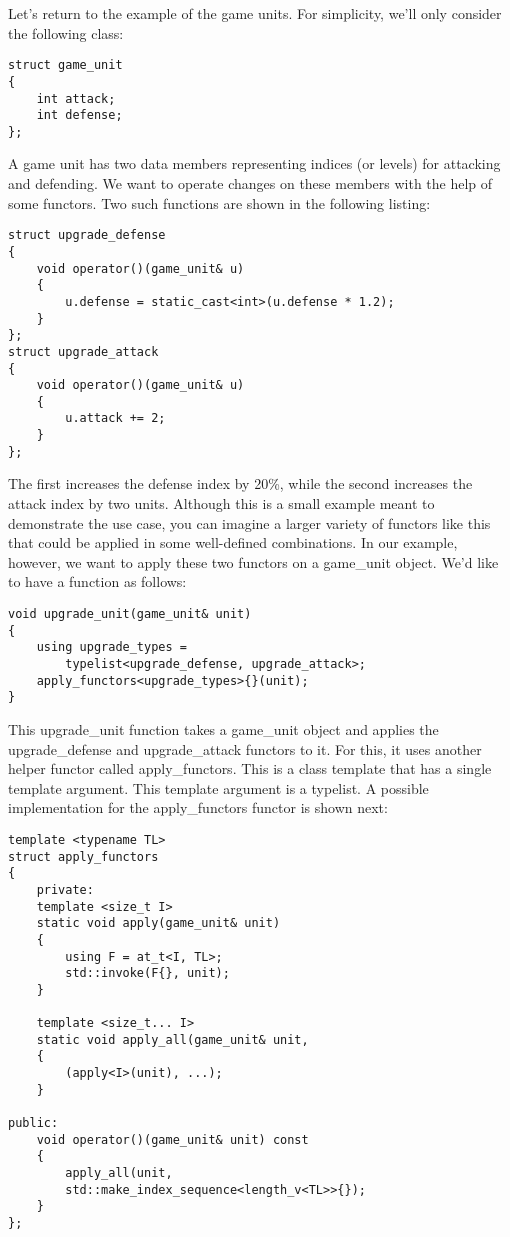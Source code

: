 Let’s return to the example of the game units. For simplicity, we’ll only consider the following class:

\begin{lstlisting}[style=styleCXX]
struct game_unit
{
	int attack;
	int defense;
};
\end{lstlisting}

A game unit has two data members representing indices (or levels) for attacking and defending. We want to operate changes on these members with the help of some functors. Two such functions are shown in the following listing:

\begin{lstlisting}[style=styleCXX]
struct upgrade_defense
{
	void operator()(game_unit& u)
	{
		u.defense = static_cast<int>(u.defense * 1.2);
	}
};
struct upgrade_attack
{
	void operator()(game_unit& u)
	{
		u.attack += 2;
	}
};
\end{lstlisting}

The first increases the defense index by 20\%, while the second increases the attack index by two units. Although this is a small example meant to demonstrate the use case, you can imagine a larger variety of functors like this that could be applied in some well-defined combinations. In our example, however, we want to apply these two functors on a game\_unit object. We’d like to have a function as follows:

\begin{lstlisting}[style=styleCXX]
void upgrade_unit(game_unit& unit)
{
	using upgrade_types =
		typelist<upgrade_defense, upgrade_attack>;
	apply_functors<upgrade_types>{}(unit);
}
\end{lstlisting}

This upgrade\_unit function takes a game\_unit object and applies the upgrade\_defense and upgrade\_attack functors to it. For this, it uses another helper functor called apply\_functors. This is a class template that has a single template argument. This template argument is a typelist. A possible implementation for the apply\_functors functor is shown next:

\begin{lstlisting}[style=styleCXX]
template <typename TL>
struct apply_functors
{
	private:
	template <size_t I>
	static void apply(game_unit& unit)
	{
		using F = at_t<I, TL>;
		std::invoke(F{}, unit);
	}

	template <size_t... I>
	static void apply_all(game_unit& unit,
	{
		(apply<I>(unit), ...);
	}

public:
	void operator()(game_unit& unit) const
	{
		apply_all(unit,
		std::make_index_sequence<length_v<TL>>{});
	}
};
\end{lstlisting}

